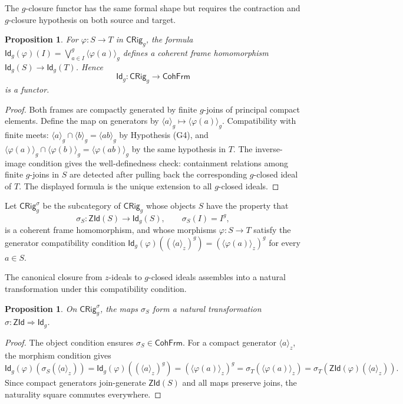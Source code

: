 \documentclass[11pt,leqno]{amsart}
\theoremstyle{plain}
\newtheorem{proposition}[theorem]{Proposition}
\theoremstyle{definition}
\theoremstyle{remark}
\numberwithin{equation}{section}
\newcommand{\ZId}{\mathsf{ZId}}
\newcommand{\GCl}{\mathsf{Id}_{g}}
\newcommand{\ideal}[1]{\langle #1\rangle}
\begin{document}
The $g$-closure functor has the same formal shape but requires the
contraction and $g$-closure hypothesis on both source and target.

\begin{proposition}\label{loc36}
For $\varphi:S\to T$ in $\mathsf{CRig}_{g}$, the formula
$\GCl(\varphi)(I)=\bigvee_{a\in I}^{g}\ideal{\varphi(a)}_g$
defines a coherent frame homomorphism $\GCl(S)\to\GCl(T)$.  Hence
\[
\GCl:\mathsf{CRig}_{g}\longrightarrow\mathsf{CohFrm}
\]
is a functor.
\end{proposition}
\begin{proof}
Both frames are compactly generated by finite $g$-joins of principal
compact elements.
Define the map on generators by $\ideal{a}_g\mapsto\ideal{\varphi(a)}_g$.
Compatibility with finite meets:
$\ideal{a}_g\cap\ideal{b}_g=\ideal{ab}_g$ by Hypothesis (G4),
and $\ideal{\varphi(a)}_g\cap\ideal{\varphi(b)}_g
=\ideal{\varphi(ab)}_g$ by the same hypothesis in $T$.
The inverse-image condition gives the well-definedness check:
containment relations among finite $g$-joins in $S$ are detected
after pulling back the corresponding $g$-closed ideal of $T$.
The displayed formula is the unique extension to all $g$-closed ideals.
\end{proof}

Let $\mathsf{CRig}_{g}^{\sigma}$ be the subcategory of
$\mathsf{CRig}_{g}$ whose objects $S$ have the property that
\[
\sigma_S:\ZId(S)\longrightarrow\GCl(S),\qquad\sigma_S(I)=I^g,
\]
is a coherent frame homomorphism, and whose morphisms $\varphi:S\to T$
satisfy the generator compatibility condition
$\GCl(\varphi)((\ideal{a}_z)^g)=(\ideal{\varphi(a)}_z)^g$
for every $a\in S$.

The canonical closure from $z$-ideals to $g$-closed ideals
assembles into a natural transformation under this compatibility condition.

\begin{proposition}\label{prop:natural-transformation}
On $\mathsf{CRig}_{g}^{\sigma}$, the maps $\sigma_S$ form a
natural transformation $\sigma:\ZId\Rightarrow\GCl$.
\end{proposition}
\begin{proof}
The object condition ensures $\sigma_S\in\mathsf{CohFrm}$.
For a compact generator $\ideal{a}_z$,
the morphism condition gives
\[
\GCl(\varphi)(\sigma_S(\ideal{a}_z))
=\GCl(\varphi)((\ideal{a}_z)^g)
=(\ideal{\varphi(a)}_z)^g
=\sigma_T(\ideal{\varphi(a)}_z)
=\sigma_T(\ZId(\varphi)(\ideal{a}_z)).
\]
Since compact generators join-generate $\ZId(S)$ and all maps
preserve joins, the naturality square commutes everywhere.
\end{proof}
\end{document}
